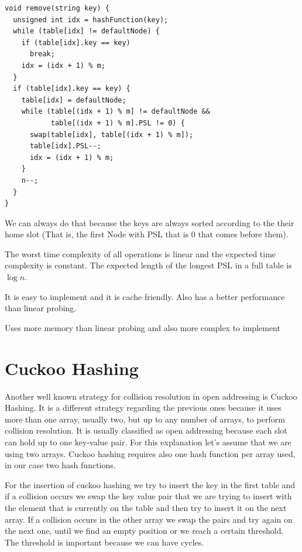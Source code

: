 \begin{lstlisting}
void remove(string key) {
  unsigned int idx = hashFunction(key);
  while (table[idx] != defaultNode) {
    if (table[idx].key == key) 
      break;
    idx = (idx + 1) % m;
  }
  if (table[idx].key == key) {
    table[idx] = defaultNode;
    while (table[(idx + 1) % m] != defaultNode &&
           table[(idx + 1) % m].PSL != 0) {
      swap(table[idx], table[(idx + 1) % m]);
      table[idx].PSL--;
      idx = (idx + 1) % m;
    }
    n--;
  }
}
\end{lstlisting}

We can always do that because the keys are always sorted according to the their home slot (That is, the first Node with PSL that is 0 that comes before them).

The worst time complexity of all operations is linear and the expected time complexity is constant. The expected length of the longest PSL in a full table is \( \log n \).

\rightthumbsup It is easy to implement and it is cache friendly. Also has a better performance than linear probing.

\rightthumbsdown Uses more memory than linear probing and also more complex to implement

\section{Cuckoo Hashing}

Another well known strategy for collision resolution in open addressing is Cuckoo Hashing. It is a different strategy regarding the previous ones because it uses more than one array, usually two, but up to any number of arrays, to perform collision resolution. It is usually classified as open addressing because each slot can hold up to one key-value pair. For this explanation let's assume that we are using two arrays. Cuckoo hashing requires also one hash function per array used, in our case two hash functions.


For the insertion of cuckoo hashing we try to insert the key in the first table and if a collision occurs we swap the key value pair that we are trying to insert with the element that is currently on the table and then try to insert it on the next array. If a collision occurs in the other array we swap the pairs and try again on the next one, until we find an empty position or we reach a certain threshold. The threshold is important because we can have cycles.

